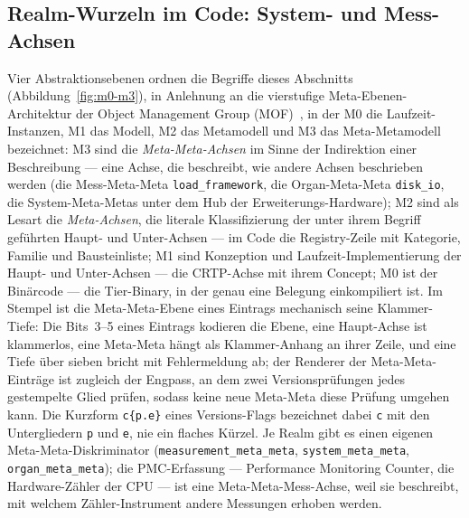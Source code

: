 \begin{nurlang}
\section{Realm-Wurzeln im Code: System- und Mess-Achsen}\label{sec:impl-system-axes}
Vier Abstraktionsebenen ordnen die Begriffe dieses Abschnitts (Abbildung~\ref{fig:m0-m3}), in Anlehnung an
die vierstufige Meta-Ebenen-Architektur der Object Management Group (MOF)~\cite{omg2016mof}, in der M0 die
Laufzeit-Instanzen, M1 das Modell, M2 das Metamodell und M3 das Meta-Metamodell bezeichnet: M3 sind die
\emph{Meta-Meta-Achsen} im Sinne der Indirektion einer Beschreibung --- eine Achse, die beschreibt, wie
andere Achsen beschrieben werden (die Mess-Meta-Meta \texttt{load\_framework}, die Organ-Meta-Meta
\texttt{disk\_io}, die System-Meta-Metas unter dem Hub der Erweiterungs-Hardware); M2 sind als Lesart
die \emph{Meta-Achsen}, die literale Klassifizierung der unter ihrem Begriff geführten Haupt- und
Unter-Achsen --- im Code die Registry-Zeile mit Kategorie, Familie und Bausteinliste; M1 sind Konzeption
und Laufzeit-Implementierung der Haupt- und Unter-Achsen --- die CRTP-Achse mit ihrem Concept; M0 ist der
Binärcode --- die Tier-Binary, in der genau eine Belegung einkompiliert ist. Im Stempel ist die
Meta-Meta-Ebene eines Eintrags mechanisch seine Klammer-Tiefe: Die Bits~3--5 eines Eintrags kodieren die
Ebene, eine Haupt-Achse ist klammerlos, eine Meta-Meta hängt als Klammer-Anhang an ihrer Zeile, und eine
Tiefe über sieben bricht mit Fehlermeldung ab; der Renderer der Meta-Meta-Einträge ist zugleich der Engpass, an dem zwei
Versionsprüfungen jedes gestempelte Glied prüfen, sodass keine neue Meta-Meta diese Prüfung umgehen
kann. Die Kurzform \texttt{c\{p.e\}} eines Versions-Flags bezeichnet dabei \texttt{c} mit den
Untergliedern \texttt{p} und \texttt{e}, nie ein flaches Kürzel. Je Realm gibt es einen eigenen
Meta-Meta-Diskriminator (\texttt{measurement\_meta\_meta}, \texttt{system\_meta\_meta},
\texttt{organ\_meta\_meta}); die PMC-Erfassung --- Performance Monitoring Counter, die Hardware-Zähler der
CPU --- ist eine Meta-Meta-Mess-Achse, weil sie beschreibt, mit welchem Zähler-Instrument andere
Messungen erhoben werden.
\begin{figure}[htbp]\centering
\end{figure}
\end{nurlang}
